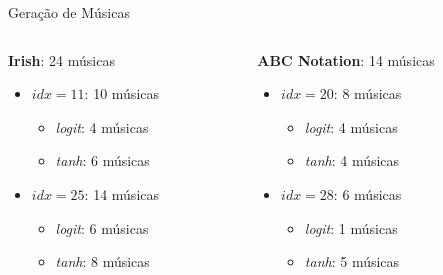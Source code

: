 \documentclass{beamer}
\begin{document}
    \begin{frame}{Geração de Músicas}
        \vspace{-1cm}
        \begin{columns}[onlytextwidth,t]
            \begin{column}{0.48\textwidth}
                \centering
                \textbf{Irish}: 24 músicas
                \vspace{0.1cm}
                \begin{itemize}
                    \item $idx=11$: 10 músicas
                    \begin{itemize}
                        \item \textit{logit}: 4 músicas
                        \item \textit{tanh}: 6 músicas
                    \end{itemize}
                    \vspace{0.25cm}
                    \item $idx=25$: 14 músicas
                    \begin{itemize}
                        \item \textit{logit}: 6 músicas 
                        \item \textit{tanh}: 8 músicas
                    \end{itemize}
                \end{itemize}
            \end{column}

            \begin{column}{0.48\textwidth}
                \centering
                \textbf{ABC Notation}: 14 músicas
                \vspace{0.1cm}
                \begin{itemize}
                    \item $idx=20$: 8 músicas
                    \begin{itemize}
                        \item \textit{logit}: 4 músicas
                        \item \textit{tanh}: 4 músicas
                    \end{itemize}
                    \vspace{0.25cm}
                    \item $idx=28$: 6 músicas
                    \begin{itemize}
                        \item \textit{logit}: 1 músicas
                        \item \textit{tanh}: 5 músicas
                    \end{itemize}
                \end{itemize}
            \end{column}
        \end{columns}
    \end{frame}
    
\end{document}
